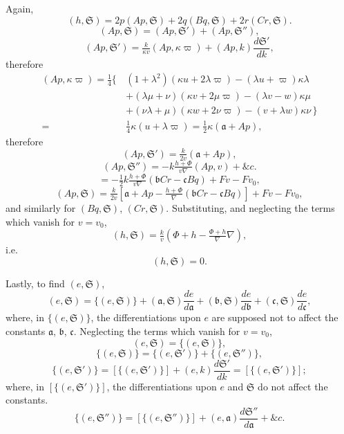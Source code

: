 \documentclass[11pt]{article}
\begin{document}
\newpage
\setcounter{page}{250}

Again,
\[
(h, \mathfrak{S}) = 2p(Ap, \mathfrak{S}) + 2q(Bq, \mathfrak{S}) + 2r(Cr, \mathfrak{S}).
\]
\[
(Ap, \mathfrak{S}) = (Ap, \mathfrak{S}') + (Ap, \mathfrak{S}''),
\]
\[
(Ap, \mathfrak{S}') = \tfrac{k}{\kappa v}(Ap, \kappa\varpi) + (Ap, k)\frac{d\mathfrak{S}'}{dk},
\]
therefore
\begin{align*}
(Ap, \kappa\varpi) = \tfrac{1}{4}\big\{\, & (1 + \lambda^2)(\kappa u + 2\lambda\varpi) - (\lambda u + \varpi)\kappa\lambda \\
& + (\lambda\mu + \nu)(\kappa v + 2\mu\varpi) - (\lambda v - w)\kappa\mu \\
& + (\nu\lambda + \mu)(\kappa w + 2\nu\varpi) - (v + \lambda w)\kappa\nu\,\big\} \\
= {}&\tfrac{1}{4}\kappa(u + \lambda\varpi) = \tfrac{1}{2}\kappa(\mathfrak{a} + Ap), \tag{55}
\end{align*}
therefore
\[
(Ap, \mathfrak{S}') = \tfrac{k}{2v}(\mathfrak{a} + Ap), \tag{56}
\]
\[
(Ap, \mathfrak{S}'') = -k\tfrac{h + \Phi}{v\nabla}(Ap, v) + \&c.
\]
\[
= -\tfrac{1}{2}k\tfrac{h + \Phi}{v\nabla}(\mathfrak{b}Cr - \mathfrak{c}Bq) + Fv - Fv_0,
\]
\[
(Ap, \mathfrak{S}) = \tfrac{k}{2v}\!\left[\mathfrak{a} + Ap - \tfrac{h + \Phi}{\nabla}(\mathfrak{b}Cr - \mathfrak{c}Bq)\right] + Fv - Fv_0,
\]
and similarly for $(Bq, \mathfrak{S})$, $(Cr, \mathfrak{S})$. Substituting, and neglecting the terms which vanish for $v = v_0$,
\[
(h, \mathfrak{S}) = \tfrac{k}{v}\!\left(\Phi + h - \tfrac{\Phi + h}{\nabla}\nabla\right),
\]
i.e.
\[
(h, \mathfrak{S}) = 0. \tag{57}
\]

Lastly, to find $(e, \mathfrak{S})$,
\[
(e, \mathfrak{S}) = \{(e, \mathfrak{S})\} + (\mathfrak{a}, \mathfrak{S})\frac{de}{d\mathfrak{a}} + (\mathfrak{b}, \mathfrak{S})\frac{de}{d\mathfrak{b}} + (\mathfrak{c}, \mathfrak{S})\frac{de}{d\mathfrak{c}},
\]
where, in $\{(e, \mathfrak{S})\}$, the differentiations upon $e$ are supposed not to affect the constants $\mathfrak{a}$, $\mathfrak{b}$, $\mathfrak{c}$. Neglecting the terms which vanish for $v = v_0$,
\[
(e, \mathfrak{S}) = \{(e, \mathfrak{S})\},
\]
\[
\{(e, \mathfrak{S})\} = \{(e, \mathfrak{S}')\} + \{(e, \mathfrak{S}'')\},
\]
\[
\{(e, \mathfrak{S}')\} = [\{(e, \mathfrak{S}')\}] + (e, k)\frac{d\mathfrak{S}'}{dk} = [\{(e, \mathfrak{S}')\}];
\]
where, in $[\{(e, \mathfrak{S}')\}]$, the differentiations upon $e$ and $\mathfrak{S}$ do not affect the constants.
\[
\{(e, \mathfrak{S}'')\} = [\{(e, \mathfrak{S}'')\}] + (e, \mathfrak{a})\frac{d\mathfrak{S}''}{d\mathfrak{a}} + \&c.
\]
\end{document}

